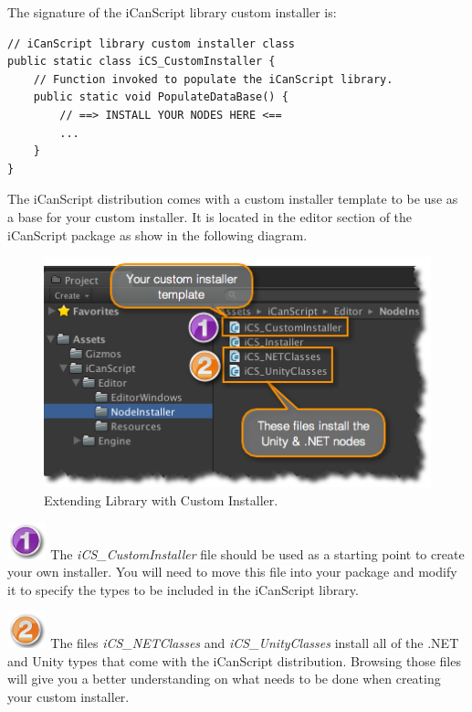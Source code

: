 The signature of the iCanScript library custom installer is:

\begin{verbatim}
// iCanScript library custom installer class
public static class iCS_CustomInstaller {
    // Function invoked to populate the iCanScript library.
    public static void PopulateDataBase() {
        // ==> INSTALL YOUR NODES HERE <==
        ...
    }
}
\end{verbatim}

The iCanScript distribution comes with a custom installer template to be use as a base for your custom installer. It is located in the editor section of the iCanScript package as show in the following diagram.

\begin{figure}[htbp]
\centering
\includegraphics[keepaspectratio,width=\textwidth,height=0.75\textheight]{extending-custom-installer.png}
\caption{Extending Library with Custom Installer.}
\label{extending-custom-installer.png}
\end{figure}

\includegraphics[width=32pt,height=30pt]{stamp-1-purple.png} The \emph{iCS\_CustomInstaller} file should be used as a starting point to create your own installer. You will need to move this file into your package and modify it to specify the types to be included in the iCanScript library.

\includegraphics[width=32pt,height=30pt]{stamp-2-orange.png} The files \emph{iCS\_NETClasses} and \emph{iCS\_UnityClasses} install all of the .NET and Unity types that come with the iCanScript distribution. Browsing those files will give you a better understanding on what needs to be done when creating your custom installer.

